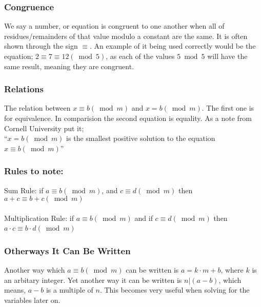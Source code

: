 \documentclass[12pft, english]{article}
\begin{document}
\begin{multicols}{2}
  \subsubsection{Congruence}
  We say a number, or equation is congruent to one another when all of residues/remainders of that value modulo a constant are the same. It is often shown through the sign \( \equiv \). An example of it being used correctly would be the equation; \( 2 \equiv 7 \equiv 12 (\bmod 5)\), as each of the values \( 5 \bmod 5\) will have the same result, meaning they are congruent. \citep{modArth}
  \subsubsection{Relations}
  The relation between \(x \equiv b (\bmod m)\) and \(x = b (\bmod m )\). The first one is for equivalence. In comparision the second equation is equality. As a note from Cornell University put it; \\ ``\(x = b (\bmod m)\) is the smallest positive solution to the equation \( x \equiv b (\bmod m)\)'' \cite{cornelMod}
  \subsubsection{Rules to note:}
  Sum Rule: if \(a \equiv b ( \bmod m)\), and \(c \equiv d (\bmod m)\) then \( a + c \equiv b + c(\bmod m)\) \cite{cornelMod} \\ \\
  Multiplication Rule: if \(a \equiv b (\bmod m)\) and if \(c \equiv d (\bmod m)\) then \( a \cdot c \equiv b \cdot d (\bmod m)\)  \cite{cornelMod} \
  \subsubsection{Otherways It Can Be Written }
  Another way which \( a \equiv b (\bmod m)\) can be written is \(a = k \cdot m + b\), where \(k\) is an arbitary integer. Yet another way it can be written is \(n | (a-b) \), which means, \(a-b\) is a multiple of \(n\). This becomes very useful when solving for the variables later on.


\end{multicols}
\end{document}
